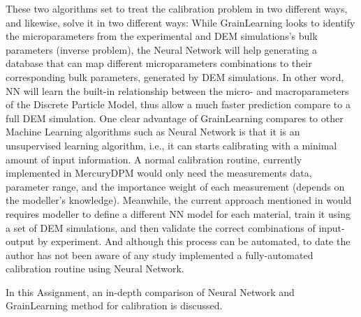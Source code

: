 \documentclass[../BachelorAssignment.tex]{subfiles}
\begin{document}
These two algorithms set to treat the calibration problem in two different ways, and likewise, solve it in two different ways: While GrainLearning looks to identify the microparameters from the experimental and DEM simulations's bulk parameters (inverse problem), the Neural Network will help generating a database that can map different microparameters combinations to their corresponding bulk parameters, generated by DEM simulations. In other word, NN will learn the built-in relationship between the micro- and macroparameters of the Discrete Particle Model, thus allow a much faster prediction compare to a full DEM simulation. One clear advantage of GrainLearning compares to other Machine Learning algorithms such as Neural Network is that it is an unsupervised learning algorithm, i.e., it can starts calibrating with a minimal amount of input information. A normal calibration routine, currently implemented in MercuryDPM would only need the measurements data, parameter range, and the importance weight of each measurement (depends on the modeller's knowledge). Meanwhile, the current approach mentioned in \cite{nn-calibration, NN-GA, NN-coarse} would requires modeller to define a different NN model for each material, train it using a set of DEM simulations, and then validate the correct combinations of input-output by experiment. And although this process can be automated, to date the author has not been aware of any study implemented a fully-automated calibration routine using Neural Network. 

In this Assignment, an in-depth comparison of Neural Network and GrainLearning method for calibration is discussed. 


\end{document}
